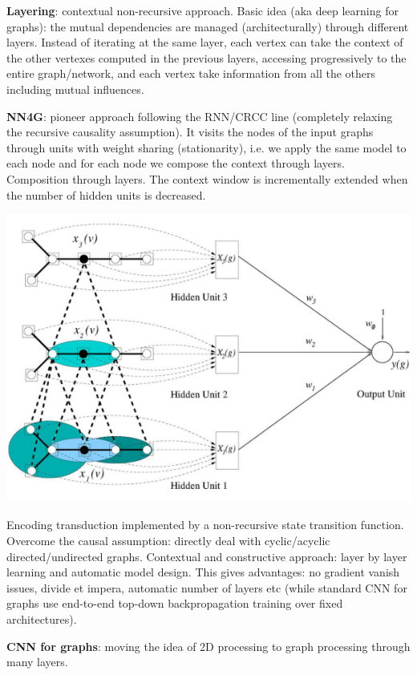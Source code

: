 \documentclass[10pt]{report}
\begin{document}
\begin{list}{}{}
\begin{list}{}{}
\begin{center}
		\end{center}
	\end{list}
	\item \textbf{Layering}: contextual non-recursive approach. Basic idea (aka deep learning for graphs): the mutual dependencies are managed (architecturally) through different layers. Instead of iterating at the same layer, each vertex can take the context of the other vertexes computed in the previous layers, accessing progressively to the entire graph/network, and each vertex take information from all the others including mutual influences.\begin{list}{}{}
		\item \textbf{NN4G}: pioneer approach following the RNN/CRCC line (completely relaxing the recursive causality assumption). It visits the nodes of the input graphs through units with weight sharing (stationarity), i.e. we apply the same model to each node and for each node we compose the context through layers.\\
		Composition through layers. The context window is incrementally extended when the number of hidden units is decreased.
		\begin{center}
			\includegraphics[scale=0.5]{48.png}
		\end{center}
		Encoding transduction implemented by a non-recursive state transition function. Overcome the causal assumption: directly deal with cyclic/acyclic directed/undirected graphs. Contextual and constructive approach: layer by layer learning and automatic model design. This gives advantages: no gradient vanish issues, divide et impera, automatic number of layers etc (while standard CNN for graphs use end-to-end top-down backpropagation training over fixed architectures).
		\item \textbf{CNN for graphs}: moving the idea of 2D processing to graph processing through many layers.
	\end{list}
\end{list}
\end{document}
